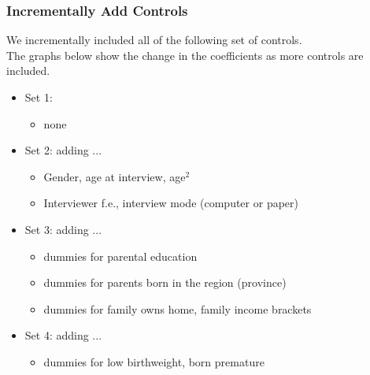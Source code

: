 \documentclass{beamer}
\begin{document}
\begin{frame}\frametitle{Incrementally Add Controls}
We incrementally included all of the following set of controls. \\
The graphs below show the change in the coefficients as more controls are included.
	\begin{itemize}
		\item Set 1:
		\begin{itemize}
			\item none
		\end{itemize}
		\item Set 2: adding ...
		\begin{itemize}
			\item Gender, age at interview, age$^2$
			\item Interviewer f.e., interview mode (computer or paper)
		\end{itemize}
		\item Set 3: adding ...
		\begin{itemize}
			\item dummies for parental education
			\item dummies for parents born in the region (province)
			\item dummies for family owns home, family income brackets
		\end{itemize}
		\item Set 4: adding ...
		\begin{itemize}
			\item dummies for low birthweight, born premature	
		\end{itemize}
	\end{itemize}
\end{frame}
  
\end{document}
